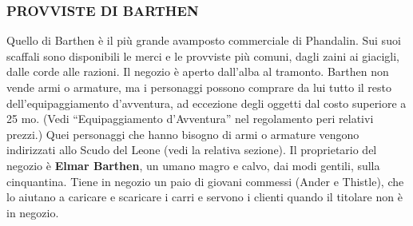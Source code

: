 \documentclass{article}
\begin{document}
\subsubsection{PROVVISTE DI BARTHEN}
\hypertarget{provviste}{}
Quello di Barthen è il più grande avamposto commerciale
di Phandalin. Sui suoi scaffali sono disponibili le merci e le
provviste più comuni, dagli zaini ai giacigli, dalle corde alle
razioni. Il negozio è aperto dall’alba al tramonto. Barthen non
vende armi o armature, ma i personaggi possono comprare
da lui tutto il resto dell’equipaggiamento d’avventura, ad
eccezione degli oggetti dal costo superiore a 25 mo. (Vedi
“Equipaggiamento d’Avventura” nel regolamento peri
relativi prezzi.) Quei personaggi che hanno bisogno di armi
o armature vengono indirizzati allo Scudo del Leone (vedi la
relativa sezione).
Il proprietario del negozio è \textbf{Elmar Barthen}, un umano
magro e calvo, dai modi gentili, sulla cinquantina. Tiene in
negozio un paio di giovani commessi (Ander e Thistle), che
lo aiutano a caricare e scaricare i carri e servono i clienti
quando il titolare non è in negozio.
\end{document}
